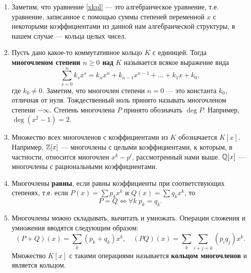 \begin{enumerate}
\item Заметим, что уравнение \eqref{xkpl} --- это алгебраическое уравнение, т.е. уравнение, записанное с помощью суммы степеней переменной $x$ с некоторыми коэффициентами из данной нам алгебраической структуры, в нашем случае --- кольца целых чисел.
\item Пусть дано какое-то коммутативное кольцо $K$ с единицей. Тогда \textbf{многочленом степени $n\ge 0$ над} $K$ называется всякое выражение вида
$$
\sum_{s=0}^n k_sx^s = k_nx^n+k_{n-1}x^{n-1}+\dots+k_1x+k_0,
$$
где $k_0\ne 0$. Заметим, что многочлен степени $n=0$ --- это константа $k_0$, отличная от нуля. Тождественный ноль принято называть многочленом степени $-\infty$. Степень многочлена $P$ принято обозначать $\deg P$. Например, $\deg(x^2-1)=2$.
\item Множество всех многочленов с коэффициентами из $K$ обозначается $K[x]$.
Например, $\mathbb Z[x]$ --- многочлены с целыми коэффициентами, к которым, в частности, относится многочлен $x^k-p^l$, рассмотренный нами выше. $\mathbb Q[x]$ --- многочлены с рациональными коэффициентами.
\item Многочлены \textbf{равны}, если равны коэффициенты при соответствующих степенях, т.е. если $P(x)=\sum p_kx^k$ и $Q(x)=\sum q_kx^k$,
то
$$
P=Q\Leftrightarrow \forall k \; p_k=q_k.
$$
\item Многочлены можно складывать, вычитать и умножать. Операции сложения и умножения вводятся следующим образом:
$$
(P+Q)(x) = \sum_k(p_k+q_k)x^k,\quad (PQ)(x) = \sum_k\sum_{i+j=k}(p_iq_j)x^k.
$$
Множество $K[x]$ с такими операциями называется \textbf{кольцом многочленов} и является кольцом.



\end{enumerate}

